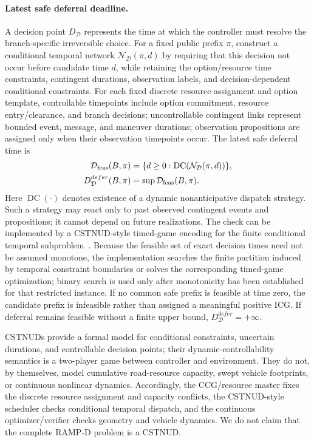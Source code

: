 \documentclass[letterpaper]{article} %
\begin{document}
\paragraph{Latest safe deferral deadline.}
A decision point $D_{\mathcal D}$ represents the time at which the controller must resolve the branch-specific irreversible choice. For a fixed public prefix $\pi$, construct a conditional temporal network $\mathcal N_{\mathcal D}(\pi,d)$ by requiring that this decision not occur before candidate time $d$, while retaining the option/resource time constraints, contingent durations, observation labels, and decision-dependent conditional constraints. For each fixed discrete resource assignment and option template, controllable timepoints include option commitment, resource entry/clearance, and branch decisions; uncontrollable contingent links represent bounded event, message, and maneuver durations; observation propositions are assigned only when their observation timepoints occur. The latest safe deferral time is
\begin{equation}
\begin{aligned}
\mathcal D_{\rm feas}(B,\pi)
&=\{d\geq0:
\operatorname{DC}(\mathcal N_{\mathcal D}(\pi,d))\},\\
D_{\mathcal D}^{defer}(B,\pi)
&=\sup\mathcal D_{\rm feas}(B,\pi).
\end{aligned}
\label{eq:deferral}
\end{equation}
Here $\operatorname{DC}(\cdot)$ denotes existence of a dynamic nonanticipative dispatch strategy. Such a strategy may react only to past observed contingent events and propositions; it cannot depend on future realizations. The check can be implemented by a CSTNUD-style timed-game encoding for the finite conditional temporal subproblem~\citep{zavatteri2019conditional}. Because the feasible set of exact decision times need not be assumed monotone, the implementation searches the finite partition induced by temporal constraint boundaries or solves the corresponding timed-game optimization; binary search is used only after monotonicity has been established for that restricted instance. If no common safe prefix is feasible at time zero, the candidate prefix is infeasible rather than assigned a meaningful positive ICG. If deferral remains feasible without a finite upper bound, $D_{\mathcal D}^{defer}=+\infty$.

CSTNUDs provide a formal model for conditional constraints, uncertain durations, and controllable decision points; their dynamic-controllability semantics is a two-player game between controller and environment. They do not, by themselves, model cumulative road-resource capacity, swept vehicle footprints, or continuous nonlinear dynamics. Accordingly, the CCG/resource master fixes the discrete resource assignment and capacity conflicts, the CSTNUD-style scheduler checks conditional temporal dispatch, and the continuous optimizer/verifier checks geometry and vehicle dynamics. We do not claim that the complete RAMP-D problem is a CSTNUD.
\end{document}
